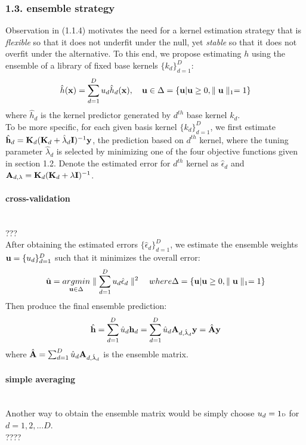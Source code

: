 \documentclass[11pt]{article}
\begin{document}
\setcounter{equation}{0}
\renewcommand{\theequation}{1.3.\arabic{equation}}
\subsubsection*{{1.3. ensemble strategy}}
Observation in (1.1.4) motivates the need for a kernel estimation strategy that is \textsl{flexible} so that it does not underfit under the null, yet \textsl{stable} so that it does not overfit under the alternative. To this end, we propose estimating $h$ using the ensemble of a library of fixed base kernels $\{k_d\}_{d=1}^D$:
\begin{align}
\hat{h}({\bf x})=\sum_{d=1}^D u_d\hat{h}_d({\bf x}), \quad {\bf u} \in \Delta=\{{\bf u} | {\bf u} \geq 0, \parallel {\bf u} \parallel_1=1\}
\end{align}
where $\hat{h}_d$ is the kernel predictor generated by $d^{th}$ base kernel $k_d$.\\
To be more specific, for each given basis kernel $\{k_d\}_{d=1}^D$, we first estimate $\hat{{\bf h}}_d={\bf K}_d({\bf K}_d+\hat{\lambda}_d{\bf I})^{-1}{\bf y}$, the prediction based on $d^{th}$ kernel, where the tuning parameter $\hat{\lambda}_d$ is selected by minimizing one of the four objective functions given in section 1.2. Denote the estimated error for $d^{th}$ kernel as $\hat{\epsilon}_d$ and ${\bf A}_{d,\lambda}={\bf K}_d({\bf K}_d+\lambda{\bf I})^{-1}$.
\paragraph{cross-validation}\mbox{}\\
???\\
After obtaining the estimated errors $\{\hat{\epsilon}_d\}_{d=1}^D$, we estimate the ensemble weights ${\bf u}=\{u_d\}_{d=1}^D$ such that it minimizes the overall error:
\begin{align*}
\hat{{\bf u}}=\underset{{\bf u} \in \Delta}{argmin}\parallel \sum_{d=1}^Du_d\hat{\epsilon}_d\parallel^2 \quad where \Delta=\{{\bf u} | {\bf u} \geq 0, \parallel {\bf u} \parallel_1=1\}
\end{align*}
Then produce the final ensemble prediction:
\begin{align*}
\hat{{\bf h}}=\sum_{d=1}^D \hat{u}_d {\bf h}_d=\sum_{d=1}^D \hat{u}_d {\bf A}_{d,\hat{\lambda}_d}{\bf y}=\hat{{\bf A}}{\bf y}
\end{align*}
where $\hat{{\bf A}}=\sum_{d=1}^D \hat{u}_d {\bf A}_{d,\hat{\lambda}_d}$ is the ensemble matrix.

\paragraph{simple averaging}\mbox{}\\
Another way to obtain the ensemble matrix would be simply choose $u_d=1\mbox{\tiny D}$ for $d=1,2,...D$.\\
????
\end{document}
